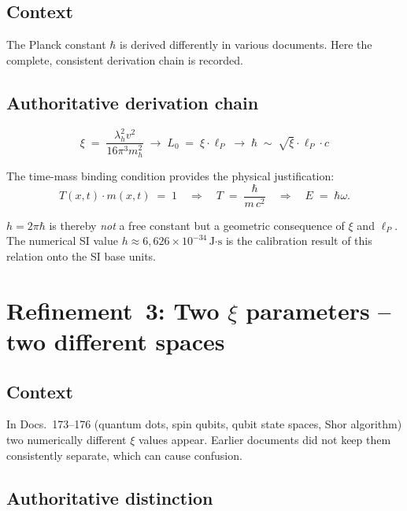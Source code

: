 \subsection*{Context}

The Planck constant $\hbar$ is derived differently in various documents. Here
the complete, consistent derivation chain is recorded.

\subsection*{Authoritative derivation chain}

\begin{equation}
  \xi \;=\; \frac{\lambda_h^2 v^2}{16\pi^3 m_h^2}
  \;\longrightarrow\;
  L_0 \;=\; \xi \cdot \ell_P
  \;\longrightarrow\;
  \hbar \;\sim\; \sqrt{\xi}\cdot \ell_P \cdot c
  \tag{190.8}
\end{equation}

The time-mass binding condition provides the physical justification:
\begin{equation}
  T(x,t)\cdot m(x,t) \;=\; 1
  \quad\Longrightarrow\quad
  T \;=\; \frac{\hbar}{m\, c^2}
  \quad\Longrightarrow\quad
  E \;=\; \hbar\omega.
  \tag{190.9}
\end{equation}

$h = 2\pi\hbar$ is thereby \emph{not} a free constant but a geometric
consequence of $\xi$ and $\ell_P$. The numerical SI value
$h \approx 6{,}626 \times 10^{-34}\,\text{J·s}$ is the calibration result of
this relation onto the SI base units.

\section{\texorpdfstring{Refinement~3: Two $\xi$ parameters -- two different spaces}{Refinement 3: Two xi parameters -- two different spaces}}

\subsection*{Context}

In Docs.~173--176 (quantum dots, spin qubits, qubit state spaces, Shor
algorithm) two numerically different $\xi$ values appear. Earlier documents did
not keep them consistently separate, which can cause confusion.

\subsection*{Authoritative distinction}

